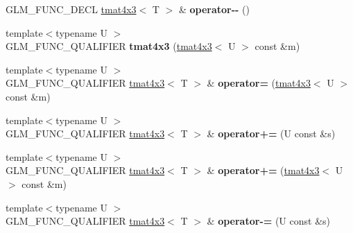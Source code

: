 \begin{DoxyCompactItemize}
\item 
\hypertarget{structglm_1_1detail_1_1tmat4x3_a2cae7d9072aad10e4a383b9cffebfa89}{G\-L\-M\-\_\-\-F\-U\-N\-C\-\_\-\-D\-E\-C\-L \hyperlink{structglm_1_1detail_1_1tmat4x3}{tmat4x3}$<$ T $>$ \& {\bfseries operator-\/-\/} ()}\label{structglm_1_1detail_1_1tmat4x3_a2cae7d9072aad10e4a383b9cffebfa89}

\item 
\hypertarget{structglm_1_1detail_1_1tmat4x3_ac1f1b11937db1b18c5bab6d3e8474d2a}{{\footnotesize template$<$typename U $>$ }\\G\-L\-M\-\_\-\-F\-U\-N\-C\-\_\-\-Q\-U\-A\-L\-I\-F\-I\-E\-R {\bfseries tmat4x3} (\hyperlink{structglm_1_1detail_1_1tmat4x3}{tmat4x3}$<$ U $>$ const \&m)}\label{structglm_1_1detail_1_1tmat4x3_ac1f1b11937db1b18c5bab6d3e8474d2a}

\item 
\hypertarget{structglm_1_1detail_1_1tmat4x3_aa6c567fb06dffe57c62138199c62909b}{{\footnotesize template$<$typename U $>$ }\\G\-L\-M\-\_\-\-F\-U\-N\-C\-\_\-\-Q\-U\-A\-L\-I\-F\-I\-E\-R \hyperlink{structglm_1_1detail_1_1tmat4x3}{tmat4x3}$<$ T $>$ \& {\bfseries operator=} (\hyperlink{structglm_1_1detail_1_1tmat4x3}{tmat4x3}$<$ U $>$ const \&m)}\label{structglm_1_1detail_1_1tmat4x3_aa6c567fb06dffe57c62138199c62909b}

\item 
\hypertarget{structglm_1_1detail_1_1tmat4x3_ae57b4d591f904e8bebc8011f0543a4d8}{{\footnotesize template$<$typename U $>$ }\\G\-L\-M\-\_\-\-F\-U\-N\-C\-\_\-\-Q\-U\-A\-L\-I\-F\-I\-E\-R \hyperlink{structglm_1_1detail_1_1tmat4x3}{tmat4x3}$<$ T $>$ \& {\bfseries operator+=} (U const \&s)}\label{structglm_1_1detail_1_1tmat4x3_ae57b4d591f904e8bebc8011f0543a4d8}

\item 
\hypertarget{structglm_1_1detail_1_1tmat4x3_a88b637e78e891f1153ef848fd682bb8e}{{\footnotesize template$<$typename U $>$ }\\G\-L\-M\-\_\-\-F\-U\-N\-C\-\_\-\-Q\-U\-A\-L\-I\-F\-I\-E\-R \hyperlink{structglm_1_1detail_1_1tmat4x3}{tmat4x3}$<$ T $>$ \& {\bfseries operator+=} (\hyperlink{structglm_1_1detail_1_1tmat4x3}{tmat4x3}$<$ U $>$ const \&m)}\label{structglm_1_1detail_1_1tmat4x3_a88b637e78e891f1153ef848fd682bb8e}

\item 
\hypertarget{structglm_1_1detail_1_1tmat4x3_ad4e51c2e110e200cd338225936da452c}{{\footnotesize template$<$typename U $>$ }\\G\-L\-M\-\_\-\-F\-U\-N\-C\-\_\-\-Q\-U\-A\-L\-I\-F\-I\-E\-R \hyperlink{structglm_1_1detail_1_1tmat4x3}{tmat4x3}$<$ T $>$ \& {\bfseries operator-\/=} (U const \&s)}\label{structglm_1_1detail_1_1tmat4x3_ad4e51c2e110e200cd338225936da452c}


\end{DoxyCompactItemize}

